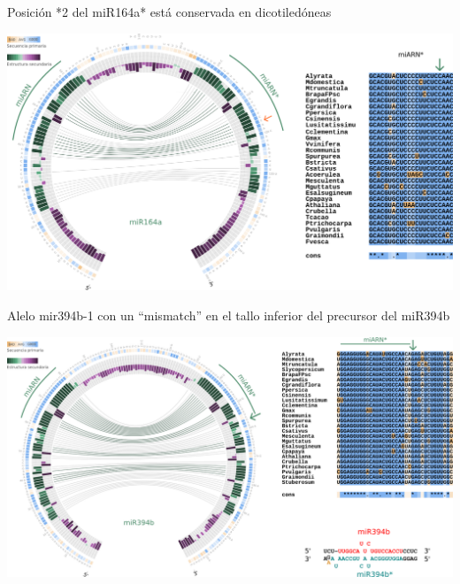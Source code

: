 \documentclass{beamer}
\begin{document}
\begin{frame}{Posición *2 del miR164a* está conservada  en dicotiledóneas}
	\begin{center}
		\includegraphics[width=.8\textwidth]{img/miR164a_circos.png}
	\end{center}
    \begin{center}
    \end{center}
\end{frame}

\begin{frame}{Alelo mir394b-1 con un ``mismatch'' en el tallo inferior del precursor del miR394b}
	\begin{center}
		\includegraphics[width=.8\textwidth]{img/miR394b_circos_aliniamientos.png}
	\end{center}
    \begin{center}
    \end{center}
\end{frame}


\end{document}
